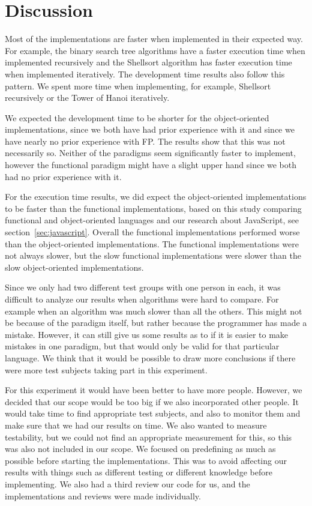 \documentclass {article}
\begin{document}
\section{Discussion}
Most of the implementations are faster when implemented in their expected way. For example, the binary search tree algorithms have a faster execution time when implemented recursively and the Shellsort algorithm has faster execution time when implemented iteratively. The development time results also follow this pattern. We spent more time when implementing, for example, Shellsort recursively or the Tower of Hanoi iteratively. 
 
We expected the development time to be shorter for the object-oriented implementations, since we both have had prior experience with it and since we have nearly no prior experience with FP. The results show that this was not necessarily so. Neither of the paradigms seem significantly faster to implement, however the functional paradigm might have a slight upper hand since we both had no prior experience with it. 
 
For the execution time results, we did expect the object-oriented implementations to be faster than the functional implementations, based on this study comparing functional and object-oriented languages \cite{hasmadole} and our research about JavaScript, see section~\ref{sec:javascript}. Overall the functional implementations performed worse than the object-oriented implementations. The functional implementations were not always slower, but the slow functional implementations were slower than the slow object-oriented implementations.
 
Since we only had two different test groups with one person in each, it was difficult to analyze our results when algorithms were hard to compare. For example when an algorithm was much slower than all the others. This might not be because of the paradigm itself, but rather because the programmer has made a mistake. However, it can still give us some results as to if it is easier to make mistakes in one paradigm, but that would only be valid for that particular language. We think that it would be possible to draw more conclusions if there were more test subjects taking part in this experiment.
 
For this experiment it would have been better to have more people. However, we decided that our scope would be too big if we also incorporated other people. It would take time to find appropriate test subjects, and also to monitor them and make sure that we had our results on time. We also wanted to measure testability, but we could not find an appropriate measurement for this, so this was also not included in our scope. We focused on predefining as much as possible before starting the implementations. This was to avoid affecting our results with things such as different testing or different knowledge before implementing. We also had a third review our code for us, and the implementations and reviews were made individually.
 
\end{document}
